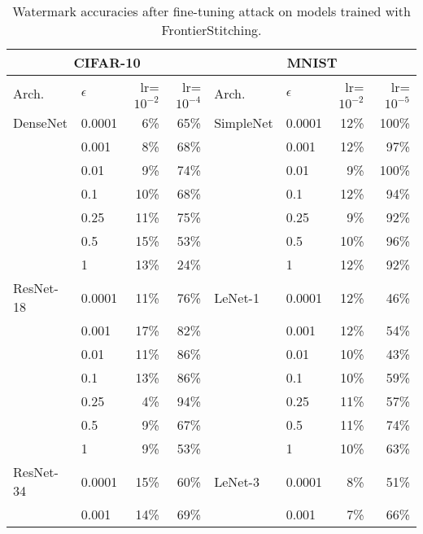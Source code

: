 \begin{table}
\small
\centering
\caption{Watermark accuracies after fine-tuning attack on models trained with FrontierStitching.}
\begin{tabular}{|l|l|r|r|l|l|r|r|}
\hline
\multicolumn{4}{|c|}{\textbf{CIFAR-10}} & \multicolumn{4}{c|}{\textbf{MNIST}}     \\ \hline
Arch.     & $\epsilon$    & lr=$10^{-2}$ & lr=$10^{-4}$ & Arch.     & $\epsilon$    & lr=$10^{-2}$ & lr=$10^{-5}$ \\ \hline
DenseNet  & 0.0001 & 6\%     & 65\%     & SimpleNet & 0.0001 & 12\%    & 100\%    \\ \hline
          & 0.001  & 8\%     & 68\%     &           & 0.001  & 12\%    & 97\%     \\ \hline
          & 0.01   & 9\%     & 74\%     &           & 0.01   & 9\%     & 100\%    \\ \hline
          & 0.1    & 10\%    & 68\%     &           & 0.1    & 12\%    & 94\%     \\ \hline
          & 0.25   & 11\%    & 75\%     &           & 0.25   & 9\%     & 92\%     \\ \hline
          & 0.5    & 15\%    & 53\%     &           & 0.5    & 10\%    & 96\%     \\ \hline
          & 1      & 13\%    & 24\%     &           & 1      & 12\%    & 92\%     \\ \hline
ResNet-18 & 0.0001 & 11\%    & 76\%     & LeNet-1   & 0.0001 & 12\%    & 46\%     \\ \hline
          & 0.001  & 17\%    & 82\%     &           & 0.001  & 12\%    & 54\%     \\ \hline
          & 0.01   & 11\%    & 86\%     &           & 0.01   & 10\%    & 43\%     \\ \hline
          & 0.1    & 13\%    & 86\%     &           & 0.1    & 10\%    & 59\%     \\ \hline
          & 0.25   & 4\%     & 94\%     &           & 0.25   & 11\%    & 57\%     \\ \hline
          & 0.5    & 9\%     & 67\%     &           & 0.5    & 11\%    & 74\%     \\ \hline
          & 1      & 9\%     & 53\%     &           & 1      & 10\%    & 63\%     \\ \hline
ResNet-34 & 0.0001 & 15\%    & 60\%     & LeNet-3   & 0.0001 & 8\%     & 51\%     \\ \hline
          & 0.001  & 14\%    & 69\%     &           & 0.001  & 7\%     & 66\%     \\ \hline

\end{tabular}
\end{table}
